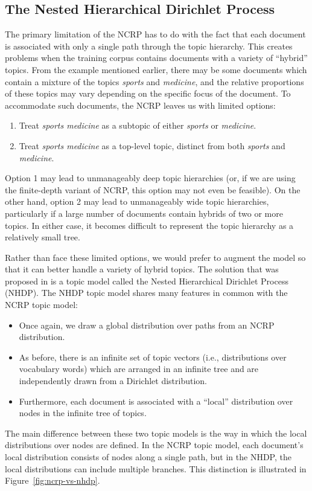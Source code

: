 \documentclass{article}
\begin{document}
\subsection{The Nested Hierarchical Dirichlet Process}

The primary limitation of the NCRP has to do with the fact that each document is associated with only a single path through the topic hierarchy.
This creates problems when the training corpus contains documents with a variety of ``hybrid'' topics.
From the example mentioned earlier, there may be some documents which contain a mixture of the topics \emph{sports} and \emph{medicine}, and the relative proportions of these topics may vary depending on the specific focus of the document.
To accommodate such documents, the NCRP leaves us with limited options:
\begin{enumerate}
\item Treat \emph{sports medicine} as a subtopic of either \emph{sports} or \emph{medicine}.
\item Treat \emph{sports medicine} as a top-level topic, distinct from both \emph{sports} and \emph{medicine}.
\end{enumerate}
Option 1 may lead to unmanageably deep topic hierarchies (or, if we are using the finite-depth variant of NCRP, this option may not even be feasible).
On the other hand, option 2 may lead to unmanageably wide topic hierarchies, particularly if a large number of documents contain hybrids of two or more topics.
In either case, it becomes difficult to represent the topic hierarchy as a relatively small tree.

Rather than face these limited options, we would prefer to augment the model so that it can better handle a variety of hybrid topics.
The solution that was proposed in \cite{paisley2015nhdp} is a topic model called the Nested Hierarchical Dirichlet Process (NHDP).
The NHDP topic model shares many features in common with the NCRP topic model:
\begin{itemize}
\item Once again, we draw a global distribution over paths from an NCRP distribution.
\item As before, there is an infinite set of topic vectors (i.e., distributions over vocabulary words) which are arranged in an infinite tree and are independently drawn from a Dirichlet distribution.
\item Furthermore, each document is associated with a ``local'' distribution over nodes in the infinite tree of topics.
\end{itemize}
The main difference between these two topic models is the way in which the local distributions over nodes are defined.
In the NCRP topic model, each document's local distribution consists of nodes along a single path, but in the NHDP, the local distributions can include multiple branches.
This distinction is illustrated in Figure~\ref{fig:ncrp-vs-nhdp}.
\end{document}
